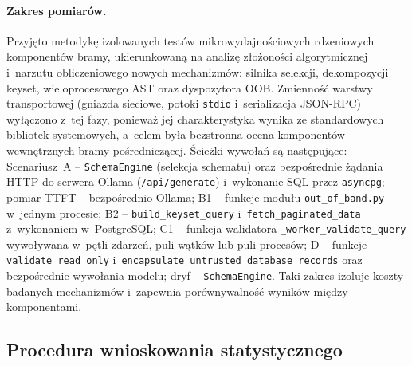 \paragraph{Zakres pomiarów.} Przyjęto metodykę izolowanych testów mikrowydajnościowych rdzeniowych komponentów bramy, ukierunkowaną na analizę złożoności algorytmicznej i~narzutu obliczeniowego nowych mechanizmów: silnika selekcji, dekompozycji keyset, wieloprocesowego AST oraz dyspozytora OOB. Zmienność warstwy transportowej (gniazda sieciowe, potoki \texttt{stdio} i~serializacja JSON-RPC) wyłączono z~tej fazy, ponieważ jej charakterystyka wynika ze standardowych bibliotek systemowych, a~celem była bezstronna ocena komponentów wewnętrznych bramy pośredniczącej. Ścieżki wywołań są następujące: Scenariusz~A -- \texttt{SchemaEngine} (selekcja schematu) oraz bezpośrednie żądania HTTP do serwera Ollama (\texttt{/api/generate}) i~wykonanie SQL przez \texttt{asyncpg}; pomiar TTFT -- bezpośrednio Ollama; B1 -- funkcje modułu \texttt{out\_of\_band.py} w~jednym procesie; B2 -- \texttt{build\_keyset\_query} i~\texttt{fetch\_paginated\_data} z~wykonaniem w~PostgreSQL; C1 -- funkcja walidatora \texttt{\_worker\_validate\_query} wywoływana w~pętli zdarzeń, puli wątków lub puli procesów; D -- funkcje \texttt{validate\_read\_only} i~\texttt{encapsulate\_untrusted\_database\_records} oraz bezpośrednie wywołania modelu; dryf -- \texttt{SchemaEngine}. Taki zakres izoluje koszty badanych mechanizmów i~zapewnia porównywalność wyników między komponentami.

\subsection{Procedura wnioskowania statystycznego}
\label{subsec:wyniki_statystyka_formalna}

